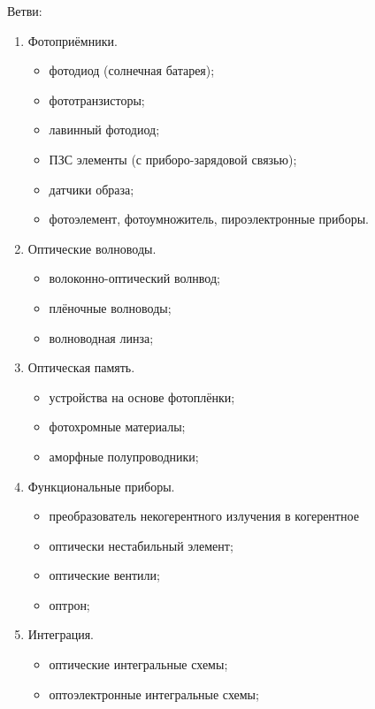 \documentclass[12pt, russian, oneside, article]{ncc}
\begin{document}
Ветви:
\begin{enumerate}
\item Фотоприёмники.

\begin{itemize}
\item фотодиод (солнечная батарея);
\item фототранзисторы;
\item лавинный фотодиод;
\item ПЗС элементы (с приборо-зарядовой связью);
\item датчики образа;
\item фотоэлемент, фотоумножитель, пироэлектронные приборы.
\end{itemize}

\item Оптические волноводы.

\begin{itemize}
\item волоконно-оптический волнвод;
\item плёночные волноводы;
\item волноводная линза;
\end{itemize}

\item Оптическая память.

\begin{itemize}
\item устройства на основе фотоплёнки;
\item фотохромные материалы;
\item аморфные полупроводники;
\end{itemize}

\item Функциональные приборы.

\begin{itemize}
\item преобразователь некогерентного излучения в когерентное
\item оптически нестабильный элемент;
\item оптические вентили;
\item оптрон;
\end{itemize}

\item Интеграция.

\begin{itemize}
\item оптические интегральные схемы;
\item оптоэлектронные интегральные схемы;
\end{itemize}


\end{enumerate}
\end{document}
